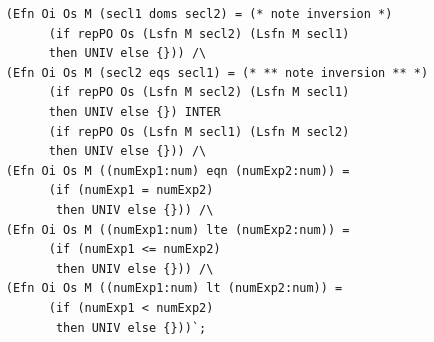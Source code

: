 \begin{session}
\begin{tiny}
\begin{verbatim}
     (Efn Oi Os M (secl1 doms secl2) = (* note inversion *)
           (if repPO Os (Lsfn M secl2) (Lsfn M secl1)
           then UNIV else {})) /\
     (Efn Oi Os M (secl2 eqs secl1) = (* ** note inversion ** *)
           (if repPO Os (Lsfn M secl2) (Lsfn M secl1)
           then UNIV else {}) INTER
           (if repPO Os (Lsfn M secl1) (Lsfn M secl2)
           then UNIV else {})) /\
     (Efn Oi Os M ((numExp1:num) eqn (numExp2:num)) =
           (if (numExp1 = numExp2)
            then UNIV else {})) /\
     (Efn Oi Os M ((numExp1:num) lte (numExp2:num)) =
           (if (numExp1 <= numExp2)
            then UNIV else {})) /\
     (Efn Oi Os M ((numExp1:num) lt (numExp2:num)) =
           (if (numExp1 < numExp2)
            then UNIV else {}))`;
\end{verbatim}
  \end{tiny}
\end{session}


